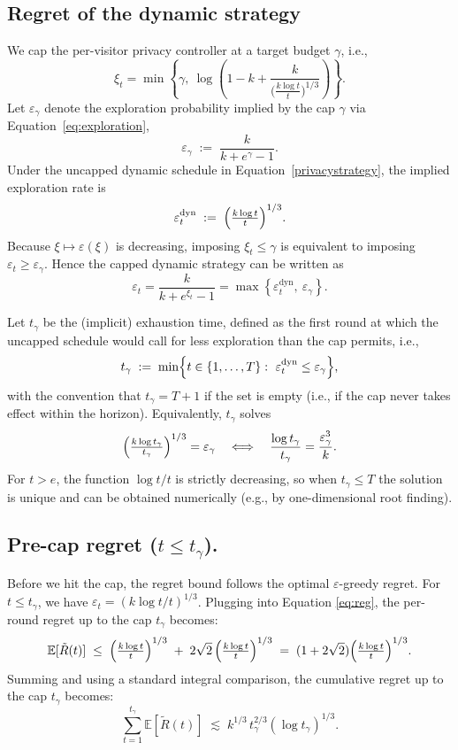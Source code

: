 \documentclass[mksc,nonblindrev]{informs3}
\begin{document}
\begin{APPENDICES}
\section{Regret of the dynamic strategy}\label{web:regret_dynamic}

We cap the per-visitor privacy controller at a target budget $\gamma$, i.e.,
\[
\xi_t=\min\!\left\{\gamma,\ \log\!\left(1-k+\frac{k}{\bigl(\frac{k\log t}{t}\bigr)^{1/3}}\right)\right\}.
\]
Let $\varepsilon_\gamma$ denote the exploration probability implied by the cap $\gamma$ via Equation~\eqref{eq:exploration},
\[
\varepsilon_\gamma \;:=\; \frac{k}{k+e^{\gamma}-1}.
\]
Under the uncapped dynamic schedule in Equation~\eqref{privacystrategy}, the implied exploration rate is
\[
\varepsilon_t^{\mathrm{dyn}} \;:=\; \Bigl(\tfrac{k\log t}{t}\Bigr)^{1/3}.
\]
Because $\xi\mapsto \varepsilon(\xi)$ is decreasing, imposing $\xi_t\le \gamma$ is equivalent to imposing
$\varepsilon_t \ge \varepsilon_\gamma$. Hence the capped dynamic strategy can be written as
\[
\varepsilon_t
=\frac{k}{k+e^{\xi_t}-1}
=\max\!\left\{\varepsilon_t^{\mathrm{dyn}},\ \varepsilon_\gamma\right\}.
\]

Let $t_\gamma$ be the (implicit) exhaustion time, defined as the first round at which the uncapped schedule would call for less exploration than the cap permits, i.e.,
\[
t_\gamma \;:=\; \min\Bigl\{t\in\{1,\dots,T\}:\ \varepsilon_t^{\mathrm{dyn}}\le \varepsilon_\gamma\Bigr\},
\]
with the convention that $t_\gamma=T+1$ if the set is empty (i.e., if the cap never takes effect within the horizon).
Equivalently, $t_\gamma$ solves
\begin{equation}\label{eq:t-gamma-def}
\Bigl(\tfrac{k\log t_\gamma}{t_\gamma}\Bigr)^{1/3}=\varepsilon_\gamma
\quad\Longleftrightarrow\quad
\frac{\log t_\gamma}{t_\gamma}=\frac{\varepsilon_\gamma^3}{k}.
\end{equation}
For $t>e$, the function $\log t/t$ is strictly decreasing, so when $t_\gamma\le T$ the solution is unique and can be obtained numerically (e.g., by one-dimensional root finding).

\subsection{Pre-cap regret ($t\le t_\gamma$).}

Before we hit the cap, the regret bound follows the optimal $\varepsilon$-greedy regret.
For $t\le t_\gamma$, we have $\varepsilon_t=(k\log t/t)^{1/3}$.
Plugging into Equation \eqref{eq:reg}, the per-round regret up to the cap $t_\gamma$ becomes: 
\[
\mathbb{E}[\tilde R(t)]
\;\le\;
\Bigl(\tfrac{k\log t}{t}\Bigr)^{1/3}
\;+\;2\sqrt{2}\,\Bigl(\tfrac{k\log t}{t}\Bigr)^{1/3}
\;=\;
(1+2\sqrt{2})\Bigl(\tfrac{k\log t}{t}\Bigr)^{1/3}.
\]
Summing and using a standard integral comparison, the cumulative regret up to the cap $t_\gamma$ becomes: 
\begin{equation}\label{eq:precap-sum}
\sum_{t=1}^{t_\gamma}\mathbb{E}[\tilde R(t)]
\;\lesssim\;
k^{1/3}\,t_\gamma^{2/3}(\log t_\gamma)^{1/3}.
\end{equation}


\end{APPENDICES}
\end{document}

